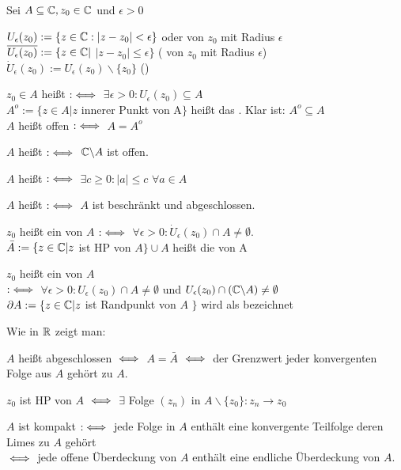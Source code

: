 \documentclass[a4paper,twoside,DIV15,BCOR12mm]{scrbook}
\def\gdw{\equizu}
\def\gdw{\equizu}
\begin{document}
\begin{definition}
Sei $A \subseteq \mathbb{C}, z_0 \in \mathbb{C}$ und $\epsilon > 0$
\begin{liste}
\item $U_{\epsilon}(z_0) := \{ z \in \mathbb{C} : |z-z_0| < \epsilon \}$  oder  von $z_0$ mit Radius $\epsilon$ \\
      $\overline{U_{\epsilon}(z_0)} := \{ z \in \mathbb{C} |$ $|z-z_0| \leq \epsilon \}$ ( von $z_0$ mit Radius $\epsilon$) \\
      $\dot{U}_{\epsilon}(z_0) := U_{\epsilon}(z_0) \backslash \{z_0\}$ ()
\item $z_0 \in A$ heißt  $:\gdw$ $\exists \epsilon > 0 : U_{\epsilon}(z_0) \subseteq A$ \\
      $A^o := \{ z\in A | z $ innerer Punkt von A$ \}$ heißt das . Klar ist: $A^o \subseteq A$\\
      $A$ heißt offen $:\gdw$ $A=A^o$
\item $A$ heißt  $:\gdw$ $\mathbb{C} \backslash A$ ist offen.
\item $A$ heißt  $:\gdw$ $\exists c \geq 0 : |a| \leq c$ $\forall a \in A$
\item $A$ heißt  $:\gdw$ $A$ ist beschränkt und abgeschlossen.
\item $z_0$ heißt ein  von $A$ $:\gdw$ $\forall \epsilon > 0:  \dot{U}_{\epsilon}(z_0) \cap A \neq \emptyset$.\\
      $\bar{A} := \{ z \in \mathbb{C} | z $ ist HP von $A$$ \} \cup A$ heißt die  von A
\item $z_0$ heißt ein  von $A$ \\ $:\gdw$ $\forall \epsilon > 0: U_{\epsilon}(z_0) \cap A \neq \emptyset$ und $U_{\epsilon}(z_0) \cap (\mathbb{C} \backslash A) \neq \emptyset$ \\
	  $\partial A := \{ z \in \mathbb{C} | z $ ist Randpunkt von $A$ $\}$ wird als  bezeichnet
\end{liste}
\end{definition}

Wie in $\mathbb{R}$ zeigt man:
\begin{satz}
\begin{liste}
\item $A$ heißt abgeschlossen $\gdw$ $A = \bar{A}$ $\gdw$ der Grenzwert jeder konvergenten Folge aus $A$ gehört zu $A$.
\item $z_0$ ist HP von $A$ $\gdw$ $\exists$ Folge $(z_n)$ in $A \backslash \{z_0\}: z_n \to z_0$
\item $A$ ist kompakt $:\gdw$ jede Folge in $A$ enthält eine konvergente Teilfolge deren Limes zu $A$ gehört \\
	  $\gdw$ jede offene Überdeckung von $A$ enthält eine endliche Überdeckung von $A$.
\end{liste}
\end{satz}
\end{document}

